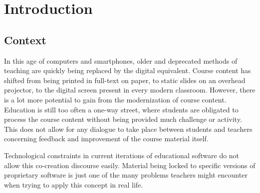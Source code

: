 
\chapter*{Introduction}
\label{ch:introduction}



\section{Context}
\label{sec:context}

In this age of computers and smartphones, older and deprecated methods of teaching are quickly being replaced by the digital equivalent. Course content has shifted from being printed in full-text on paper, to static slides on an overhead projector, to the digital screen present in every modern classroom. However, there is a lot more potential to gain from the modernization of course content. Education is still too often a one-way street, where students are obligated to process the course content without being provided much challenge or activity. This does not allow for any dialogue to take place between students and teachers concerning feedback and improvement of the course material itself.

Technological constraints in current iterations of educational software do not allow this co-creation discourse easily. Material being locked to specific versions of proprietary software is just one of the many problems teachers might encounter when trying to apply this concept in real life.

